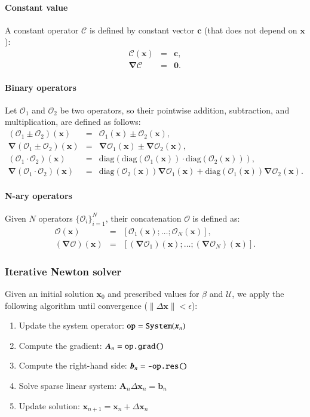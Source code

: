 \documentclass[final]{elsarticle}
\newcommand{\diag}{\ensuremath{\mathrm{diag}}}
\newcommand\eps \epsilon
\newcommand\bnabla{\boldsymbol{\nabla}}
\newcommand\bx{\boldsymbol{x}}
\newcommand\bc{\boldsymbol{c}}
\newcommand\bzero{\boldsymbol{0}}
\newcommand\cO{\mathcal{O}}
\newcommand\cU{\mathscr{U}}
\begin{document}
\paragraph{Constant value}
A constant operator $\mathcal{C}$ is defined by constant vector $\bc$ 
(that does not depend on $\bx$):
\begin{eqnarray*}
\mathcal{C}(\bx) &=& \bc, \\
\bnabla\mathcal{C} &=& \bzero.
\end{eqnarray*}

\paragraph{Binary operators}
Let $\cO_1$ and $\cO_2$ be two operators, so their pointwise addition, subtraction,
and multiplication, are defined as follows:
\begin{eqnarray*}
(\cO_1 \pm \cO_2)(\bx) &=& \cO_1(\bx) \pm \cO_2(\bx), \\
\bnabla (\cO_1 \pm \cO_2)(\bx)   &=& \bnabla\cO_1(\bx) \pm \bnabla\cO_2(\bx), \\
(\cO_1 \cdot \cO_2)(\bx) &=& \diag(\diag(\cO_1(\bx)) \cdot \diag(\cO_2(\bx))), \\
\bnabla (\cO_1 \cdot \cO_2)(\bx) &=& \diag(\cO_2(\bx)) \bnabla\cO_1(\bx) 
                                  + \diag(\cO_1(\bx)) \bnabla\cO_2(\bx).
\end{eqnarray*}

\paragraph{N-ary operators}
Given $N$ operators $\{\cO_i\}_{i=1}^N$, their concatenation $\cO$ is defined as:
\begin{eqnarray*}
\cO(\bx) &=& [\cO_1(\bx); \ldots; \cO_N(\bx)], \\
(\bnabla\cO)(\bx) &=& [(\bnabla\cO_1)(\bx); \ldots; (\bnabla\cO_N)(\bx)].
\end{eqnarray*}

\subsubsection{Iterative Newton solver}
Given an initial solution $\bx_0$ and prescribed values for $\beta$ and $\cU$, 
we apply the following algorithm 
until convergence ($\|\Delta \bx\| < \eps$):
\begin{enumerate}
\item Update the system operator: $\verb|op| = \verb|System|(\bx_{n})$
\item Compute the gradient: $\boldsymbol{A}_n = \verb|op.grad()|$
\item Compute the right-hand side: $\boldsymbol{b}_n = \verb|-op.res()|$
\item Solve sparse linear system: $\boldsymbol{A}_n \Delta \bx_n = \boldsymbol{b}_n$
\item Update solution: $\bx_{n+1} = \bx_{n} + \Delta \bx_{n}$
\end{enumerate}
\end{document}
